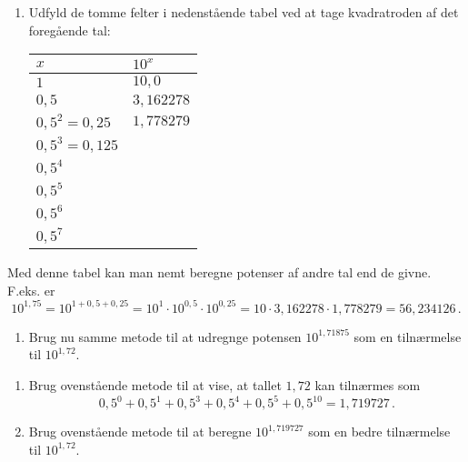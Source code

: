 \documentclass[12pt,oneside,a4paper]{article}
\theoremstyle{plain}
\begin{document}
\begin{enumerate}[label=(\alph*), resume]
    \item Udfyld de tomme felter i nedenstående tabel ved at tage kvadratroden
        af det foregående tal:
        \begin{center}
            \begin{tabular}{|l|l|}
\hline
                $x$ & $10^x$ \\
                \hline
                $1$ & $10,0$ \\
                \hline
                $0,5$ & $3,162278$ \\
                \hline
                $0,5^2 = 0,25$ & $1,778279$ \\
                \hline
                $0,5^3 = 0,125$ &  \\
                \hline
                $0,5^4$ & \\
                \hline
                $0,5^5$ & \\
                \hline
                $0,5^6$ & \\
                \hline
                $0,5^7$ & \\
                \hline
            \end{tabular}
        \end{center}
\end{enumerate}

Med denne tabel kan man nemt beregne potenser af andre tal end de givne. F.eks. er 
\[
    10^{1,75} = 10^{1+0,5+0,25} = 10^1 \cdot 10^{0,5} \cdot 10^{0,25}
    = 10 \cdot 3,162278 \cdot 1,778279 = 56,234126 \,.
\]

\begin{enumerate}[label=(\alph*), resume]
    \item Brug nu samme metode til at udregnge potensen $10^{1,71875}$ som en
        tilnærmelse til $10^{1,72}$.
\end{enumerate}

\begin{enumerate}[label=(\alph*), resume]
    \item Brug ovenstående metode til at vise, at tallet $1,72$ kan tilnærmes som
        \[
            0,5^0 + 0,5^1 + 0,5^3 + 0,5^4 + 0,5^5 + 0,5^{10} = 1,719727 \,.
        \]
\item Brug ovenstående metode til at beregne $10^{1,719727}$ som en bedre
        tilnærmelse til $10^{1,72}$.
\end{enumerate}
\end{document}
